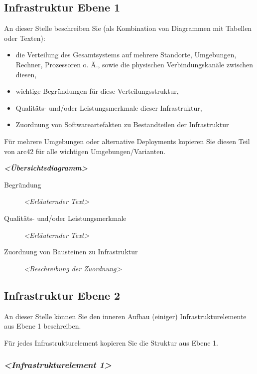 \documentclass[]{article}
\begin{document}
\hypertarget{_infrastruktur_ebene_1}{%
\subsection{Infrastruktur Ebene 1}\label{_infrastruktur_ebene_1}}

An dieser Stelle beschreiben Sie (als Kombination von Diagrammen mit
Tabellen oder Texten):

\begin{itemize}
\item
  die Verteilung des Gesamtsystems auf mehrere Standorte, Umgebungen,
  Rechner, Prozessoren o. Ä., sowie die physischen Verbindungskanäle
  zwischen diesen,
\item
  wichtige Begründungen für diese Verteilungsstruktur,
\item
  Qualitäts- und/oder Leistungsmerkmale dieser Infrastruktur,
\item
  Zuordnung von Softwareartefakten zu Bestandteilen der Infrastruktur
\end{itemize}

Für mehrere Umgebungen oder alternative Deployments kopieren Sie diesen
Teil von arc42 für alle wichtigen Umgebungen/Varianten.

\emph{\textbf{\textless{}Übersichtsdiagramm\textgreater{}}}

\begin{description}
\item[Begründung]
\emph{\textless{}Erläuternder Text\textgreater{}}
\item[Qualitäts- und/oder Leistungsmerkmale]
\emph{\textless{}Erläuternder Text\textgreater{}}
\item[Zuordnung von Bausteinen zu Infrastruktur]
\emph{\textless{}Beschreibung der Zuordnung\textgreater{}}
\end{description}

\hypertarget{_infrastruktur_ebene_2}{%
\subsection{Infrastruktur Ebene 2}\label{_infrastruktur_ebene_2}}

An dieser Stelle können Sie den inneren Aufbau (einiger)
Infrastrukturelemente aus Ebene 1 beschreiben.

Für jedes Infrastrukturelement kopieren Sie die Struktur aus Ebene 1.

\hypertarget{__emphasis_infrastrukturelement_1_emphasis}{%
\subsubsection{\texorpdfstring{\emph{\textless{}Infrastrukturelement
1\textgreater{}}}{\textless{}Infrastrukturelement 1\textgreater{}}}\label{__emphasis_infrastrukturelement_1_emphasis}}
\end{document}
